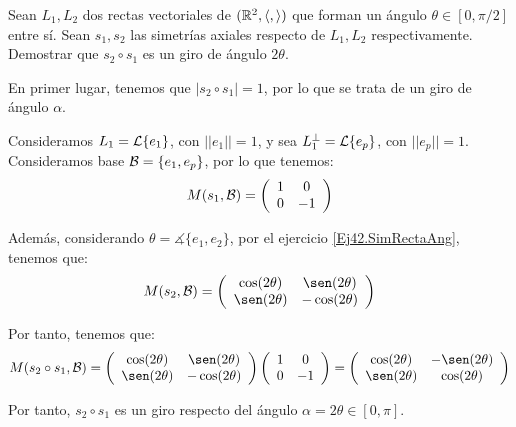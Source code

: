 \begin{ejercicio}
    Sean $L_1, L_2$ dos rectas vectoriales de $(\mathbb{R}^2, \langle,\rangle)$ que forman un ángulo $\theta \in [0,\pi/2]$ entre sí. Sean $s_1, s_2$ las simetrías axiales respecto de $L_1, L_2$ respectivamente. Demostrar que $s_2\circ s_1$ es un giro de ángulo $2\theta$.

    En primer lugar, tenemos que $|s_2\circ s_1| = 1$, por lo que se trata de un giro de ángulo $\alpha$.

    Consideramos $L_1=\mathcal{L}\{e_1\}$, con $||e_1||=1$, y sea $L_1^\perp = \mathcal{L}\{e_p\}$, con $||e_p||=1$. Consideramos base $\mathcal{B}=\{e_1, e_p\}$, por lo que tenemos:
    \begin{equation*}
        M(s_1,\mathcal{B})=\left(\begin{array}{cc}
            1 & 0 \\
            0 & -1
        \end{array}\right)
    \end{equation*}


    Además, considerando $\theta=\measuredangle\{e_1, e_2\}$, por el ejercicio \ref{Ej42.SimRectaAng}, tenemos que:
    \begin{equation*}
        M(s_2,\cc{B})=\left(\begin{array}{cc}
            \cos(2\theta) & \sen(2\theta) \\
            \sen(2\theta) & -\cos(2\theta)
        \end{array}\right)
    \end{equation*}

    Por tanto, tenemos que:
    \begin{equation*}
        M(s_2\circ s_1,\cc{B})=
        \left(\begin{array}{cc}
            \cos(2\theta) & \sen(2\theta) \\
            \sen(2\theta) & -\cos(2\theta)
        \end{array}\right)
        \left(\begin{array}{cc}
            1 & 0 \\
            0 & -1
        \end{array}\right)
        = \left(\begin{array}{cc}
            \cos(2\theta) & -\sen(2\theta) \\
            \sen(2\theta) & \cos(2\theta)
        \end{array}\right)
    \end{equation*}

    Por tanto, $s_2\circ s_1$ es un giro respecto del ángulo $\alpha=2\theta\in [0,\pi]$.
\end{ejercicio}




